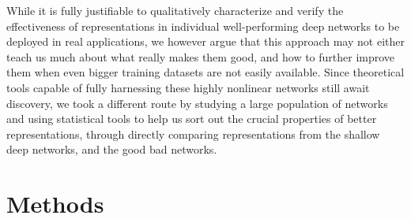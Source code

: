 \documentclass[fleqn]{article} %
\makeatletter
\DeclareRobustCommand\onedot{\futurelet\@let@token\@onedot}
\def\@onedot{\ifx\@let@token.\else.\null\fi\xspace}
\def\eg{\emph{e.g}\onedot} \def\Eg{\emph{E.g}\onedot}
\makeatother
\begin{document}
While it is fully justifiable to qualitatively characterize and verify the effectiveness of representations in individual well-performing deep networks to be deployed in real applications, we however argue that this approach may not either teach us much about what really makes them good, and how to further improve them when even bigger training datasets are not easily available.
Since theoretical tools capable of fully harnessing these highly nonlinear networks still await discovery, we took a different route by studying a large population of networks and using statistical tools to help us sort out the crucial properties of better representations, through directly comparing representations from the shallow \vs deep networks, and the good \vs bad networks.


\section{Methods}
\label{sec:methods}
\end{document}
